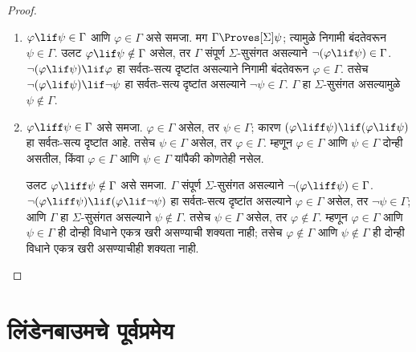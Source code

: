 \begin{proof}
\begin{enumerate}
  \item $\varphi \lif \psi \in
      \Gamma$ आणि $\varphi \in \Gamma$ असे समजा.
      मग $\Gamma \Proves[\Sigma] \psi$;
      त्यामुळे निगामी बंदतेवरून $\psi \in \Gamma$.
      उलट $\varphi
      \lif \psi \notin \Gamma$ असेल, तर
      $\Gamma$ संपूर्ण $\Sigma$-सुसंगत
      असल्याने $\lnot (\varphi \lif \psi) \in \Gamma$.
      $\lnot(\varphi \lif \psi) \lif \varphi$ हा
      सर्वतः-सत्य दृष्टांत असल्याने निगामी
      बंदतेवरून $\varphi \in
      \Gamma$. तसेच $\lnot(\varphi \lif \psi) \lif
      \lnot \psi$ हा सर्वतः-सत्य दृष्टांत असल्याने
      $\lnot \psi \in
      \Gamma$. $\Gamma$ हा $\Sigma$-सुसंगत
      असल्यामुळे $\psi \notin \Gamma$.

  \item $\varphi \liff \psi \in
      \Gamma$ असे समजा. $\varphi \in \Gamma$
      असेल, तर $\psi \in \Gamma$; कारण $(\varphi
      \liff \psi) \lif (\varphi \lif \psi)$ हा
      सर्वतः-सत्य दृष्टांत आहे. तसेच
      $\psi \in \Gamma$ असेल, तर $\varphi \in \Gamma$.
      म्हणून $\varphi \in \Gamma$ आणि $\psi \in \Gamma$
      दोन्ही असतील, किंवा $\varphi \in \Gamma$
      आणि $\psi \in \Gamma$ यांपैकी कोणतेही नसेल.

      उलट $\varphi \liff \psi \notin \Gamma$
      असे समजा. $\Gamma$ संपूर्ण
      $\Sigma$-सुसंगत असल्याने
      $\lnot (\varphi \liff \psi) \in
      \Gamma$. $\lnot(\varphi \liff \psi) \lif (\varphi \lif \lnot \psi)$
      हा सर्वतः-सत्य दृष्टांत असल्याने
      $\varphi \in \Gamma$ असेल, तर
      $\lnot \psi \in
      \Gamma$; आणि $\Gamma$ हा
      $\Sigma$-सुसंगत असल्याने $\psi \notin
      \Gamma$. तसेच $\psi \in \Gamma$
      असेल, तर $\varphi \notin \Gamma$.
      म्हणून $\varphi \in \Gamma$ आणि $\psi \in \Gamma$
      ही दोन्ही विधाने एकत्र खरी असण्याची शक्यता नाही;
      तसेच $\varphi \notin \Gamma$ आणि $\psi \notin \Gamma$
      ही दोन्ही विधाने एकत्र खरी असण्याचीही शक्यता नाही.
  \end{enumerate}
\end{proof}















\section{लिंडेनबाउमचे पूर्वप्रमेय}\label{nml:com:lin:sec}

